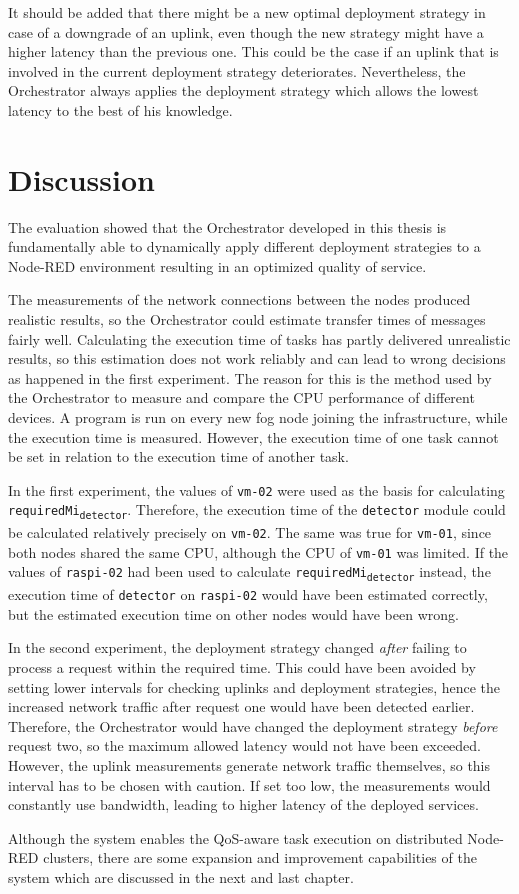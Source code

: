 It should be added that there might be a new optimal deployment strategy in case of a downgrade of an uplink, even though the new strategy might have a higher latency than the previous one.
This could be the case if an uplink that is involved in the current deployment strategy deteriorates.
Nevertheless, the Orchestrator always applies the deployment strategy which allows the lowest latency to the best of his knowledge.


\clearpage
\section{Discussion}

The evaluation showed that the Orchestrator developed in this thesis is fundamentally able to dynamically apply different deployment strategies to a Node-RED environment resulting in an optimized quality of service.

The measurements of the network connections between the nodes produced realistic results, so the Orchestrator could estimate transfer times of messages fairly well.
Calculating the execution time of tasks has partly delivered unrealistic results, so this estimation does not work reliably and can lead to wrong decisions as happened in the first experiment.
The reason for this is the method used by the Orchestrator to measure and compare the CPU performance of different devices.
A program is run on every new fog node joining the infrastructure, while the execution time is measured.
However, the execution time of one task cannot be set in relation to the execution time of another task.

In the first experiment, the values of \texttt{vm-02} were used as the basis for calculating \texttt{requiredMi\textsubscript{detector}}.
Therefore, the execution time of the \texttt{detector} module could be calculated relatively precisely on \texttt{vm-02}.
The same was true for \texttt{vm-01}, since both nodes shared the same CPU, although the CPU of \texttt{vm-01} was limited.
If the values of \texttt{raspi-02} had been used to calculate \texttt{requiredMi\textsubscript{detector}} instead, the execution time of \texttt{detector} on \texttt{raspi-02} would have been estimated correctly, but the estimated execution time on other nodes would have been wrong.

In the second experiment, the deployment strategy changed \textit{after} failing to process a request within the required time.
This could have been avoided by setting lower intervals for checking uplinks and deployment strategies, hence the increased network traffic after request one would have been detected earlier.
Therefore, the Orchestrator would have changed the deployment strategy \textit{before} request two, so the maximum allowed latency would not have been exceeded.
However, the uplink measurements generate network traffic themselves, so this interval has to be chosen with caution.
If set too low, the measurements would constantly use bandwidth, leading to higher latency of the deployed services.

Although the system enables the QoS-aware task execution on distributed Node-RED clusters, there are some expansion and improvement capabilities of the system which are discussed in the next and last chapter.